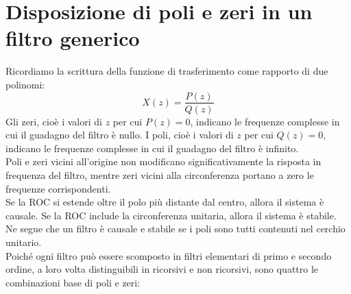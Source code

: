 \section{Disposizione di poli e zeri in un filtro generico}
Ricordiamo la scrittura della funzione di trasferimento come rapporto di due polinomi:
\begin{displaymath}
X(z)=\frac{P(z)}{Q(z)}
\end{displaymath}
Gli zeri, cio\`e i valori di $z$ per cui $P(z)=0$, indicano le frequenze complesse in cui il guadagno del filtro \`e nullo.
I poli, cio\`e i valori di $z$ per cui $Q(z)=0$, indicano le frequenze complesse in cui il guadagno del filtro \`e infinito.\\
Poli e zeri vicini all'origine non modificano significativamente la risposta in
frequenza del filtro, mentre zeri vicini alla circonferenza portano a zero le frequenze corrispondenti.\\
Se la ROC si estende oltre il polo pi\`u distante dal centro, allora il sistema \`e causale. Se la ROC include la circonferenza unitaria, allora il sistema \`e stabile. Ne segue che un filtro \`e causale e stabile se i poli sono tutti contenuti nel cerchio unitario.\\
Poich\'e ogni filtro pu\`o essere scomposto in filtri elementari di primo e secondo ordine, a loro volta distinguibili in ricorsivi e non ricorsivi, sono quattro le combinazioni base di poli e zeri:
